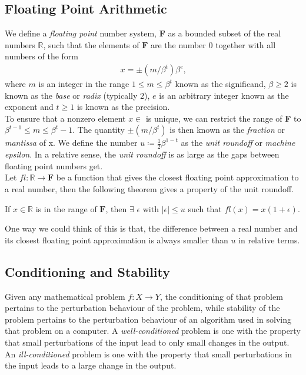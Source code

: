 \subsection{Floating Point Arithmetic}
We define a \textit{floating point} number system, \textbf{F} as a bounded subset of the real numbers $\mathbb{R}$, such that the elements of $\mathbf{F}$ are the number $0$ together with all numbers of the form
\begin{align*}
	x = \pm(m / \beta^t)\beta^e\text{{,}}
\end{align*}
where $m$ is an integer in the range $1\leq m\leq \beta^t$ known as the significand, $\beta \geq 2$ is known as the \textit{base} or \textit{radix} (typically $2$), $e$ is an arbitrary integer known as the exponent and $t\geq 1$ is known as the precision.\\
To ensure that a nonzero element $x \in$  is unique, we can restrict the range of \textbf{F} to $\beta^{t-1} \leq m \leq \beta^t - 1$. The quantity $\pm(m/\beta^t)$ is then known as the \textit{fraction} or \textit{mantissa} of x. We define the number $u \coloneq \frac{1}{2}\beta^{1-t}$ as the \textit{unit roundoff} or \textit{machine epsilon}. In a relative sense, the \textit{unit roundoff} is as large as the gaps between floating point numbers get.\\
Let $fl :  \mathbb{R} \rightarrow \mathbf{F}$ be a function that gives the closest floating point approximation to a real number, then the following theorem gives a property of the unit roundoff.
\begin{theorem}
	If $x \in \mathbb{R}$ is in the range of $\mathbf{F}$, then $\exists$ $\epsilon$ with $|\epsilon| \le u$ such that $fl(x) = x(1+\epsilon)$.
\end{theorem}
One way we could think of this is that, the difference between a real number and its closest floating point approximation is always smaller than $u$ in relative terms.

\subsection{Conditioning and Stability}\label{sec:ConditioningAndStability}
Given any mathematical problem $f: X \rightarrow Y$, the conditioning of that problem pertains to the perturbation behaviour of the problem, while stability of the problem pertains to the perturbation behaviour of an algorithm used in solving that problem on a computer. A \textit{well-conditioned} problem is one with the property that small perturbations of the input lead to only small changes in the output. An \textit{ill-conditioned} problem is one with the property that small perturbations in the input leads to a large change in the output.


